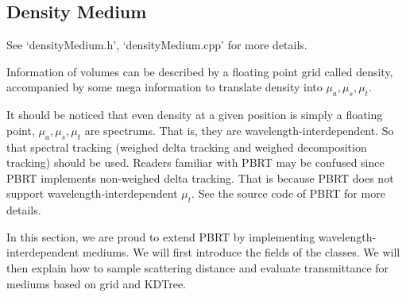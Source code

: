 \documentclass[acmtog]{acmart}
\begin{document}
\subsection{Density Medium}
    See `densityMedium.h', `densityMedium.cpp' for more details.\par
        Information of volumes can be described by a floating point grid called density, 
    accompanied by some mega information to translate density into $\mu_a, \mu_s, \mu_t$.\par
        It should be noticed that even density at a given position is simply a floating point, 
    $\mu_a, \mu_s, \mu_t$ are spectrums.
    That is, they are wavelength-interdependent.
    So that spectral tracking (weighed delta tracking and weighed decomposition tracking) should be used.
    Readers familiar with PBRT may be confused since PBRT implements non-weighed delta tracking.
    That is because PBRT does not support wavelength-interdependent $\mu_t$.
    See the source code of PBRT for more details.\par
        In this section, we are proud to extend PBRT by implementing wavelength-interdependent mediums.
    We will first introduce the fields of the classes.
    We will then explain how to sample scattering distance and evaluate transmittance for mediums based on grid and KDTree.
\end{document}
